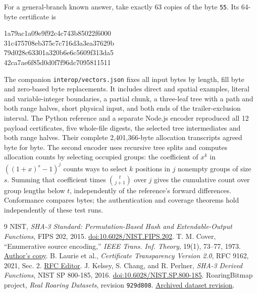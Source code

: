 \documentclass[10pt,twocolumn,letterpaper]{article}
\begin{document}
For a general-branch known answer, take exactly 63 copies of the byte \texttt{55}. Its 64-byte certificate is
\begin{center}\small\ttfamily
1a79ac1a09e9f92c4c743b85022f6000\\
31c475708eb375c7c716d3a3ea37629b\\
79d028c63301a320b6e6c5609f313da5\\
42ca7ae6f85d0d0f7f96dc7095811511
\end{center}

The companion \texttt{interop/vectors.json} fixes all input bytes by length, fill byte and zero-based byte replacements. It includes direct and spatial examples, literal and variable-integer boundaries, a partial chunk, a three-leaf tree with a path and both range halves, short physical input, and both ends of the trailer-exclusion interval. The Python reference and a separate Node.js encoder reproduced all 12 payload certificates, five whole-file digests, the selected tree intermediates and both range halves. Their complete 2,401,366-byte allocation transcripts agreed byte for byte. The second encoder uses recursive tree splits and computes allocation counts by selecting occupied groups: the coefficient of \(x^k\) in \(((1+x)^s-1)^j\) counts ways to select \(k\) positions in \(j\) nonempty groups of size \(s\). Summing that coefficient times \(\binom{t}{j+1}\) over \(j\) gives the cumulative count over group lengths below \(t\), independently of the reference's forward differences. Conformance compares bytes; the authentication and coverage theorems hold independently of these test runs.

\balance
\begin{thebibliography}{9}\small
{} NIST, \emph{SHA-3 Standard: Permutation-Based Hash and Extendable-Output Functions}, FIPS 202, 2015. \href{https://doi.org/10.6028/NIST.FIPS.202}{doi:10.6028/NIST.FIPS.202}.
 T. M. Cover, ``Enumerative source encoding,'' \emph{IEEE Trans. Inf. Theory}, 19(1), 73--77, 1973. \href{https://isl.stanford.edu/~cover/papers/transIT/0073cove.pdf}{Author's copy}.
 B. Laurie et al., \emph{Certificate Transparency Version 2.0}, RFC 9162, 2021, Sec. 2. \href{https://www.rfc-editor.org/rfc/rfc9162.html}{RFC Editor}.
 J. Kelsey, S. Chang, and R. Perlner, \emph{SHA-3 Derived Functions}, NIST SP 800-185, 2016. \href{https://doi.org/10.6028/NIST.SP.800-185}{doi:10.6028/NIST.SP.800-185}.
 RoaringBitmap project, \emph{Real Roaring Datasets}, revision \texttt{929d808}. \href{https://github.com/RoaringBitmap/real-roaring-datasets/tree/929d8088817840f43ffaa8592b49373b5a2d43b2}{Archived dataset revision}.
\end{thebibliography}
\end{document}
